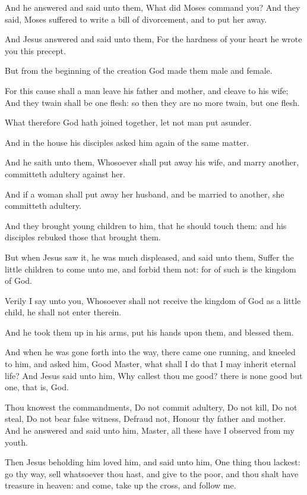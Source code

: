 \Verse And he answered and said unto them, What did Moses command you?  \Verse And they said, Moses suffered to write a bill of divorcement, and to put her away.

\Verse And Jesus answered and said unto them, For the hardness of your heart he wrote you this precept.

\Verse But from the beginning of the creation God made them male and female.

\Verse For this cause shall a man leave his father and mother, and cleave to his wife; \Verse And they twain shall be one flesh: so then they are no more twain, but one flesh.

\Verse What therefore God hath joined together, let not man put asunder.

\Verse And in the house his disciples asked him again of the same matter.

\Verse And he saith unto them, Whosoever shall put away his wife, and marry another, committeth adultery against her.

\Verse And if a woman shall put away her husband, and be married to another, she committeth adultery.

\Verse And they brought young children to him, that he should touch them: and his disciples rebuked those that brought them.

\Verse But when Jesus saw it, he was much displeased, and said unto them, Suffer the little children to come unto me, and forbid them not: for of such is the kingdom of God.

\Verse Verily I say unto you, Whosoever shall not receive the kingdom of God as a little child, he shall not enter therein.

\Verse And he took them up in his arms, put his hands upon them, and blessed them.

\Verse And when he was gone forth into the way, there came one running, and kneeled to him, and asked him, Good Master, what shall I do that I may inherit eternal life?  \Verse And Jesus said unto him, Why callest thou me good? there is none good but one, that is, God.

\Verse Thou knowest the commandments, Do not commit adultery, Do not kill, Do not steal, Do not bear false witness, Defraud not, Honour thy father and mother.  \Verse And he answered and said unto him, Master, all these have I observed from my youth.

\Verse Then Jesus beholding him loved him, and said unto him, One thing thou lackest: go thy way, sell whatsoever thou hast, and give to the poor, and thou shalt have treasure in heaven: and come, take up the cross, and follow me.


